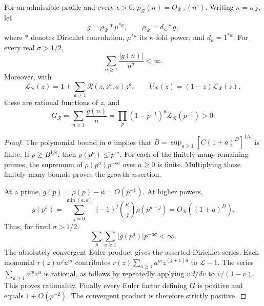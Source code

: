 \begin{lemma}
\label{lem:v5-log-convolution}
For an admissible profile and every $\epsilon>0$,
$\rho_{\mathcal R}(n)=O_{\mathcal R,\epsilon}(n^\epsilon)$.
Writing $\kappa=\kappa_{\mathcal R}$, let
\[
 g=\rho_{\mathcal R}*\mu^{*\kappa},
 \qquad \rho_{\mathcal R}=d_\kappa*g,
\]
where $*$ denotes Dirichlet convolution, $\mu^{*\kappa}$ its
$\kappa$-fold power, and $d_\kappa=1^{*\kappa}$.
For every real $\sigma>1/2$,
\[
 \sum_{n\geq1}\frac{|g(n)|}{n^\sigma}<\infty.
\]
Moreover, with
\[
 \mathcal L_{\mathcal R}(z)
   =1+\sum_{a\geq1}\mathcal R(z,z^a,a)z^a,
 \qquad U_{\mathcal R}(z)=(1-z)\mathcal L_{\mathcal R}(z),
\]
these are rational functions of $z$, and
\[
 G_{\mathcal R}
 =\sum_{n\geq1}\frac{g(n)}n
 =\prod_p(1-p^{-1})^\kappa\mathcal L_{\mathcal R}(p^{-1})>0.
\]
\end{lemma}
\begin{proof}
The polynomial bound in $a$ implies that
$B=\sup_{a\geq1}[C(1+a)^D]^{1/a}$ is finite. If
$p\geq B^{1/\epsilon}$, then $\rho(p^a)\leq p^{\epsilon a}$.
For each of the finitely many remaining primes, the supremum of
$\rho(p^a)p^{-\epsilon a}$ over $a\geq0$ is finite. Multiplying those
finitely many bounds proves the growth assertion.

At a prime, $g(p)=\rho(p)-\kappa=O(p^{-1})$. At higher powers,
\[
 g(p^a)=\sum_{j=0}^{\min(a,\kappa)}
             (-1)^j\binom\kappa j\rho(p^{a-j})
             =O_{\mathcal R}((1+a)^D).
\]
Thus, for fixed $\sigma>1/2$,
\[
 \sum_p\sum_{a\geq1}|g(p^a)|p^{-a\sigma}<\infty.
\]
The absolutely convergent Euler product gives the asserted Dirichlet
series. Each monomial $r(z)w^ju^m$ contributes
$r(z)\sum_{a\geq1}a^m z^{(j+1)a}$ to $\mathcal L-1$.
The series $\sum_{a\geq1}a^m v^a$ is rational, as follows by repeatedly
applying $v\,d/dv$ to $v/(1-v)$. This proves rationality.
Finally every Euler factor defining $G$ is positive and equals
$1+O(p^{-2})$. The convergent product is therefore strictly positive.
\end{proof}

